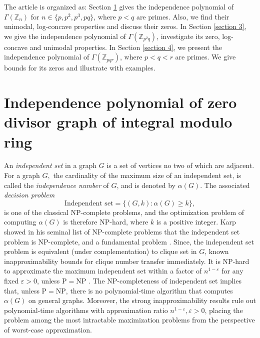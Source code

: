 \documentclass[12pt,twoside]{article}
\begin{document}
The article is organized as: Section \ref{section 2} gives the independence polynomial of $\varGamma(\mathbb{Z}_{n})$ for $n\in \{p,p^{2},p^{3},pq\}$, where $p<q$ are primes. Also, we find their unimodal, log-concave properties and discuss their zeros. In Section \ref{section 3}, we give the independence polynomial of $\varGamma(\mathbb{Z}_{p^{2}q})$, investigate its zero, log-concave and unimodal properties. In Section \ref{section 4}, we present the independence polynomial of $\varGamma(\mathbb{Z}_{pqr})$, where $p<q<r$ are primes. We give bounds for its zeros and illustrate with examples. 


\section{Independence polynomial of zero divisor graph of integral modulo ring}\label{section 2}
An \emph{independent set} in a graph $G$ is a set of vertices no two of which are adjacent. For a graph $G,$ the cardinality of the maximum size of an independent set, is called the \emph{independence number} of $G$, and is denoted by $\alpha(G)$. The associated \emph{decision problem}
$$
\text{Independent set}=\{(G,k): \alpha(G)\ge k\},
$$
is one of the classical NP-complete problems, and the optimization problem of computing $\alpha(G)$ is therefore NP-hard, where $k$ is a positive integer. Karp showed in his seminal list of NP-complete problems that the independent set problem is NP-complete, and a fundamental problem \cite{karp1972,garey1979}.  Since, the independent set problem is equivalent (under complementation) to clique set in $G$, known inapproximability bounds for clique number transfer immediately. It is NP-hard to approximate the maximum independent set within a factor of $n^{1-\varepsilon}$ for any fixed $\varepsilon>0$, unless $\mathrm{P}=\mathrm{NP}$ \cite{Hastad99}.   The NP-completeness of independent set implies that, unless $\mathrm{P}=\mathrm{NP}$, there is no polynomial-time algorithm that computes $\alpha(G)$ on general graphs. Moreover, the strong inapproximability results rule out polynomial-time algorithms with approximation ratio $n^{1-\varepsilon}, \varepsilon>0$, placing the problem among the most intractable maximization problems from the perspective of worst-case approximation.
\end{document}
